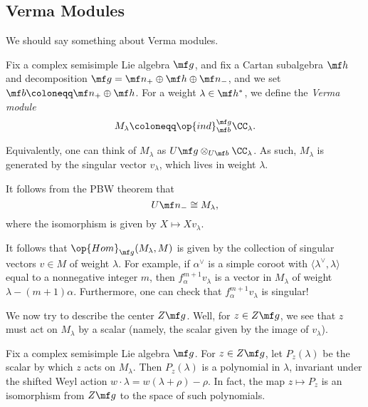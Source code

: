 \documentclass[../notes.tex]{subfiles}
\begin{document}
\subsection{Verma Modules}
We should say something about Verma modules.
\begin{definition}
	Fix a complex semisimple Lie algebra $\mf g$, and fix a Cartan subalgebra $\mf h$ and decomposition $\mf g=\mf n_+\oplus\mf h\oplus\mf n_-$, and we set $\mf b\coloneqq\mf n_+\oplus\mf h$. For a weight $\lambda\in\mf h^*$, we define the \textit{Verma module}
	\[M_\lambda\coloneqq\op{ind}_{\mf b}^{\mf g}\CC_\lambda.\]
\end{definition}
\begin{remark}
	Equivalently, one can think of $M_\lambda$ as $U\mf g\otimes_{U\mf b}\CC_\lambda$. As such, $M_\lambda$ is generated by the singular vector $v_\lambda$, which lives in weight $\lambda$.
\end{remark}
\begin{remark}
	It follows from the PBW theorem that
	\[U\mf n_-\cong M_\lambda,\]
	where the isomorphism is given by $X\mapsto Xv_\lambda$.
\end{remark}
\begin{remark}
	It follows that $\op{Hom}_{\mf g}(M_\lambda,M)$ is given by the collection of singular vectors $v\in M$ of weight $\lambda$. For example, if $\alpha^\lor$ is a simple coroot with $\langle\lambda^\lor,\lambda\rangle$ equal to a nonnegative integer $m$, then $f_\alpha^{m+1}v_\lambda$ is a vector in $M_\lambda$ of weight $\lambda-(m+1)\alpha$. Furthermore, one can check that $f_\alpha^{m+1}v_\lambda$ is singular!
\end{remark}
We now try to describe the center $Z\mf g$. Well, for $z\in Z\mf g$, we see that $z$ must act on $M_\lambda$ by a scalar (namely, the scalar given by the image of $v_\lambda$).
\begin{theorem}
	Fix a complex semisimple Lie algebra $\mf g$. For $z\in Z\mf g$, let $P_z(\lambda)$ be the scalar by which $z$ acts on $M_\lambda$. Then $P_z(\lambda)$ is a polynomial in $\lambda$, invariant under the shifted Weyl action $w\cdot\lambda=w(\lambda+\rho)-\rho$. In fact, the map $z\mapsto P_z$ is an isomorphism from $Z\mf g$ to the space of such polynomials.
\end{theorem}
\end{document}
